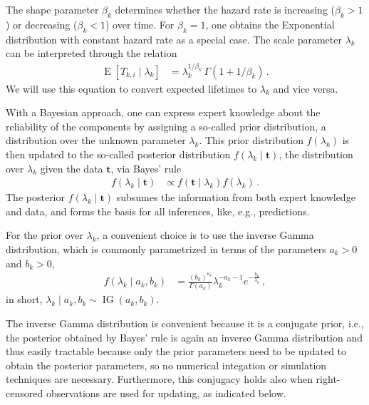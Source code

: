 \documentclass[authoryear]{elsarticle}
\renewcommand{\vec}[1]{{\bm#1}}
\newcommand{\E}{\operatorname{E}}
\newcommand{\ig}{\operatorname{IG}}   %
\begin{document}
The shape parameter $\beta_k$ determines whether the hazard rate is increasing ($\beta_k > 1$)
or decreasing ($\beta_k < 1$) over time.
For $\beta_k=1$, one obtains the Exponential distribution with constant hazard rate as a special case.
The scale parameter $\lambda_k$ can be interpreted through the relation
\begin{align}
\E[T_{k,i} \mid \lambda_k] &= \lambda_k^{1/\beta_k}\, \Gamma(1 + 1/\beta_k)\,.
\label{eq:lambdainterpret}
\end{align}
We will use this equation to convert expected lifetimes to $\lambda_k$ and vice versa.

With a Bayesian approach, one can express expert knowledge about the reliability of the components
by assigning a so-called prior distribution,
a distribution over the unknown parameter $\lambda_k$.
This prior distribution $f(\lambda_k)$ is then updated 
to the so-called posterior distribution $f(\lambda_k \mid \vec{t})$,
the distribution over $\lambda_k$ given the data $\vec{t}$,
via Bayes' rule
\begin{align*}
f(\lambda_k \mid \vec{t}) &\propto f(\vec{t}\mid\lambda_k) f(\lambda_k)\,.
\end{align*}
The posterior $f(\lambda_k \mid \vec{t})$ subsumes the information
from both expert knowledge and data,
and forms the basis for all inferences, like, e.g., predictions.

For the prior over $\lambda_k$,
a convenient choice is to use the inverse Gamma distribution,
which is commonly parametrized in terms of the parameters $a_k > 0$ and $b_k > 0$,
\begin{align}
f(\lambda_k\mid a_k,b_k) &= \frac{(b_k)^{a_k}}{\Gamma(a_k)} \lambda_k^{-a_k -1} e^{-\frac{b_k}{\lambda_k}}\,,
\label{eq:ig-def}
\end{align}
in short, $\lambda_k \mid a_k, b_k \sim \ig(a_k,b_k)$.

The inverse Gamma distribution is convenient because it is a conjugate prior,
i.e., the posterior obtained by Bayes' rule is again an inverse Gamma distribution and thus easily tractable
because only the prior parameters need to be updated to obtain the posterior parameters,
so no numerical integation or simulation techniques are necessary.
Furthermore, this conjugacy holds also when right-censored observations are used for updating,
as indicated below.
\end{document}

